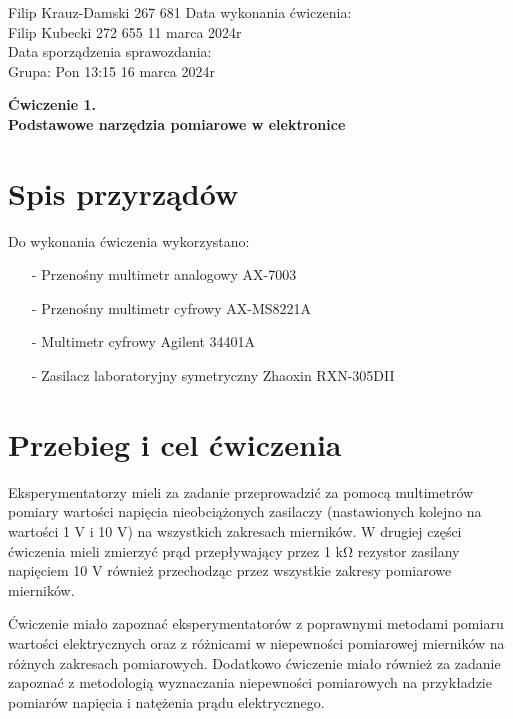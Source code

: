 \documentclass[11pt]{article}
\begin{document}
    \begin{flushleft}
        Filip Krauz-Damski 267 681 \hfill Data wykonania ćwiczenia:\\
        Filip Kubecki 272 655 \hfill 11 marca 2024r\\
        \hfill Data sporządzenia sprawozdania:\\
        Grupa: Pon 13:15 \hfill 16 marca 2024r\\
    \end{flushleft}
    \begin{center}
        \Large\textbf{Ćwiczenie 1.}\\
        \textbf{Podstawowe narzędzia pomiarowe w elektronice}
    \end{center}
    \vspace{1cm}

    \section{Spis przyrządów}
    \par{
        Do wykonania ćwiczenia wykorzystano:
        \begin{itemize}
            \setlength\itemsep{0em}
            \item[-] Przenośny multimetr analogowy AX-7003
            \item[-] Przenośny multimetr cyfrowy AX-MS8221A
            \item[-] Multimetr cyfrowy Agilent 34401A
            \item[-] Zasilacz laboratoryjny symetryczny Zhaoxin RXN-305DII
        \end{itemize}
    }
    \section{Przebieg i cel ćwiczenia}
    \par{
        Eksperymentatorzy mieli za zadanie przeprowadzić za pomocą multimetrów pomiary wartości napięcia nieobciążonych zasilaczy (nastawionych kolejno na wartości 1 V
        i 10 V) na wszystkich zakresach mierników. W drugiej części ćwiczenia mieli zmierzyć
        prąd przepływający przez 1 kΩ rezystor zasilany napięciem 10 V również przechodząc
        przez wszystkie zakresy pomiarowe mierników.
    }
    \par{
        Ćwiczenie miało zapoznać eksperymentatorów z poprawnymi metodami pomiaru
        wartości elektrycznych oraz z różnicami w niepewności pomiarowej mierników na różnych
        zakresach pomiarowych. Dodatkowo ćwiczenie miało również za zadanie zapoznać z
        metodologią wyznaczania niepewności pomiarowych na przykładzie pomiarów napięcia
        i natężenia prądu elektrycznego.
    }
    \newpage
\end{document}
